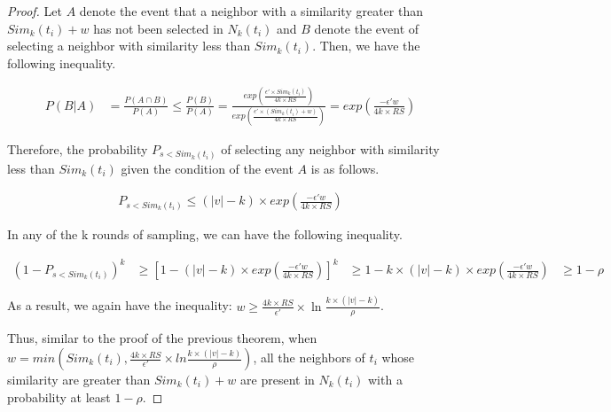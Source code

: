 \documentclass[11pt]{article}
\theoremstyle{plain}
\theoremstyle{definition}
\begin{document}
\begin{proof}
Let $A$ denote the event that a neighbor with a similarity greater than $Sim_k(t_i) + w$ has not been selected in $N_k(t_i)$ and $B$ denote 
the event of selecting a neighbor with similarity less than $Sim_k(t_i)$. Then, we have the following inequality.

\begin{align*}
P(B | A) &= \frac{P(A \cap B)}{P(A)}
\leq \frac{P(B)}{P(A)} = \frac{
exp(\frac{\epsilon' \times Sim_k(t_i)}
{4k \times RS})
}
{exp(\frac{\epsilon' \times (Sim_k(t_i) + w)}{4k \times RS})}
= exp(\frac{-\epsilon' w}{4k \times RS})
\end{align*}

Therefore, the probability $P_{s < Sim_{k} (t_i)}$ of selecting any neighbor with similarity less than $Sim_k(t_i)$ given the condition of the event $A$ is as follows.

\begin{align*}
P_{s < Sim_k (t_i)} \leq (\lvert v \rvert - k) \times exp(\frac{-\epsilon' w}{4k \times RS})
\end{align*}

In any of the k rounds of sampling, we can have the following inequality.

\begin{align*}
(1 - P_{s < Sim_k (t_i)})^k &\geq [1 - (\lvert v \rvert - k) \times exp(\frac{-\epsilon' w}{4k \times RS})]^k
&\geq 1 - k \times (\lvert v \rvert - k) \times exp(\frac{-\epsilon' w}{4k \times RS})
&\geq 1 - \rho
\end{align*}

As a result, we again have the inequality: $w \geq \frac{4k \times RS}{\epsilon'} \times \ln \frac{k\times (\lvert v \rvert - k)}{\rho}$.

Thus, similar to the proof of the previous theorem, when $w=min(Sim_k(t_i), \frac{4k \times RS}{\epsilon'} \times ln\frac{k \times (|v| - k)}{\rho})$, all the neighbors of $t_i$ whose similarity are greater than $Sim_k(t_i) + w$ are present in $N_k(t_i)$ with a probability at least $1-\rho$.

\end{proof}
\end{document}
